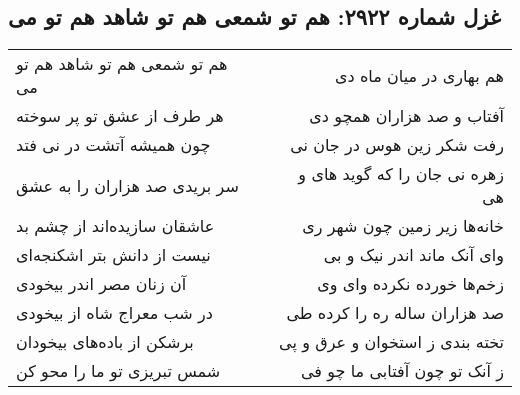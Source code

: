 \begin{center}
\section*{غزل شماره ۲۹۲۲: هم تو شمعی هم تو شاهد هم تو می}
\label{sec:2922}
\begin{longtable}{l p{0.5cm} r}
هم تو شمعی هم تو شاهد هم تو می
&&
هم بهاری در میان ماه دی
\\
هر طرف از عشق تو پر سوخته
&&
آفتاب و صد هزاران همچو دی
\\
چون همیشه آتشت در نی فتد
&&
رفت شکر زین هوس در جان نی
\\
سر بریدی صد هزاران را به عشق
&&
زهره نی جان را که گوید های و هی
\\
عاشقان سازیده‌اند از چشم بد
&&
خانه‌ها زیر زمین چون شهر ری
\\
نیست از دانش بتر اشکنجه‌ای
&&
وای آنک ماند اندر نیک و بی
\\
آن زنان مصر اندر بیخودی
&&
زخم‌ها خورده نکرده وای وی
\\
در شب معراج شاه از بیخودی
&&
صد هزاران ساله ره را کرده طی
\\
برشکن از باده‌های بیخودان
&&
تخته بندی ز استخوان و عرق و پی
\\
شمس تبریزی تو ما را محو کن
&&
ز آنک تو چون آفتابی ما چو فی
\\
\end{longtable}
\end{center}
